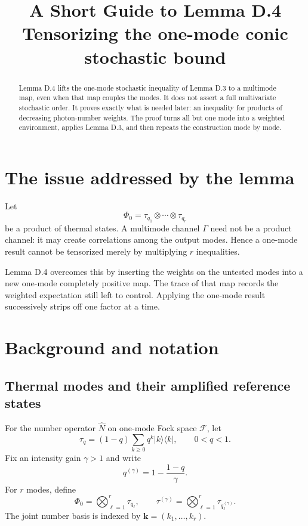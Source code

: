 \documentclass[11pt]{article}
\title{A Short Guide to Lemma D.4\\
\large Tensorizing the one-mode conic stochastic bound}
\author{}
\date{}
\newcommand{\F}{\mathcal F}
\newcommand{\ketbra}[1]{\lvert #1\rangle\!\langle #1\rvert}
\begin{document}
\maketitle

\begin{abstract}
Lemma D.4 lifts the one-mode stochastic inequality of Lemma D.3 to a
multimode map, even when that map couples the modes.  It does not assert a
full multivariate stochastic order.  It proves exactly what is needed later:
an inequality for products of decreasing photon-number weights.  The proof
turns all but one mode into a weighted environment, applies Lemma D.3, and
then repeats the construction mode by mode.
\end{abstract}

\section{The issue addressed by the lemma}

Let
\[
  \Phi_0=\tau_{q_1}\otimes\cdots\otimes\tau_{q_r}
\]
be a product of thermal states.  A multimode channel $\Gamma$ need not be a
product channel: it may create correlations among the output modes.  Hence a
one-mode result cannot be tensorized merely by multiplying $r$ inequalities.

Lemma D.4 overcomes this by inserting the weights on the untested modes into
a new one-mode completely positive map.  The trace of that map records the
weighted expectation still left to control.  Applying the one-mode result
successively strips off one factor at a time.

\section{Background and notation}

\subsection{Thermal modes and their amplified reference states}

For the number operator $\widehat N$ on one-mode Fock space $\F$, let
\[
  \tau_q=(1-q)\sum_{k\geq0}q^k\ketbra{k},
  \qquad 0<q<1.
\]
Fix an intensity gain $\gamma>1$ and write
\[
  q^{(\gamma)}=1-\frac{1-q}{\gamma}.
\]
For $r$ modes, define
\begin{equation}\label{eq:states}
  \Phi_0=\bigotimes_{\ell=1}^r\tau_{q_\ell},
  \qquad
  \tau^{(\gamma)}
  =\bigotimes_{\ell=1}^r\tau_{q_\ell^{(\gamma)}}.
\end{equation}
The joint number basis is indexed by
$\mathbf k=(k_1,\ldots,k_r)$.
\end{document}
